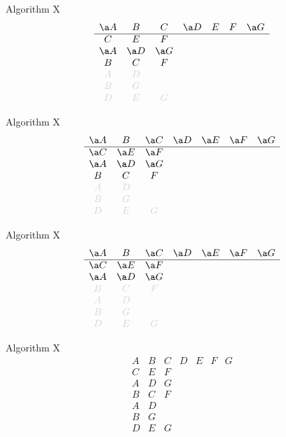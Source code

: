 \documentclass[xcolor=svgnames]{beamer}
\begin{document}
\def\lg{\color{LightGray}}
%
\begin{frame}{Algorithm X}
\Large\boldmath
  $$
  \begin{array}{ccccccc}
    \a A & B & C & \a D & E & F & \a G\\
    \hline
    C & E & F &&&&\\
    \a A & \a D & \a G &&&&\\
    B & C & F &&&&\\
    \lg A & \lg D &&&&&\\
    \lg B & \lg G &&&&&\\
    \lg D & \lg E & \lg G &&&&
  \end{array}
  $$
\end{frame}

%
\begin{frame}{Algorithm X}
\Large\boldmath
  $$
  \begin{array}{ccccccc}
    \a A & B & \a C & \a D & \a E & \a F & \a G\\
    \hline
    \a C & \a E & \a F &&&&\\
    \a A & \a D & \a G &&&&\\
    B & C & F &&&&\\
    \lg A & \lg D &&&&&\\
    \lg B & \lg G &&&&&\\
    \lg D & \lg E & \lg G &&&&
  \end{array}
  $$
\end{frame}

%
\begin{frame}{Algorithm X}
  \Large\boldmath
  $$
  \begin{array}{ccccccc}
    \a A & B & \a C & \a D & \a E & \a F & \a G\\
    \hline
    \a C & \a E & \a F &&&&\\
    \a A & \a D & \a G &&&&\\
    \lg B & \lg C & \lg F &&&&\\
    \lg A & \lg D &&&&&\\
    \lg B & \lg G &&&&&\\
    \lg D & \lg E & \lg G &&&&
  \end{array}
  $$
\end{frame}

%
\begin{frame}{Algorithm X}
\Large\boldmath
  $$
  \begin{array}{ccccccc}
    A & B & C & D & E & F & G\\
    \hline
    C & E & F &&&&\\
    A & D & G &&&&\\
    B & C & F &&&&\\
    A & D &&&&&\\
    B & G &&&&&\\
    D & E & G &&&&
  \end{array}
  $$
\end{frame}
\end{document}
